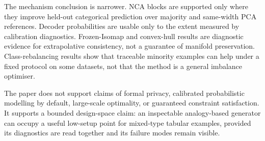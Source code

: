 The mechanism conclusion is narrower. NCA blocks are supported only where they
improve held-out categorical prediction over majority and same-width PCA
references. Decoder probabilities are usable only to the extent measured by
calibration diagnostics. Frozen-Isomap and convex-hull results are diagnostic
evidence for extrapolative consistency, not a guarantee of manifold
preservation. Class-rebalancing results show that traceable minority examples
can help under a fixed protocol on some datasets, not that the method is a
general imbalance optimiser.

The paper does not support claims of formal privacy, calibrated probabilistic
modelling by default, large-scale optimality, or guaranteed constraint
satisfaction. It supports a bounded design-space claim: an inspectable
analogy-based generator can occupy a useful low-setup point for mixed-type
tabular examples, provided its diagnostics are read together and its failure
modes remain visible.

